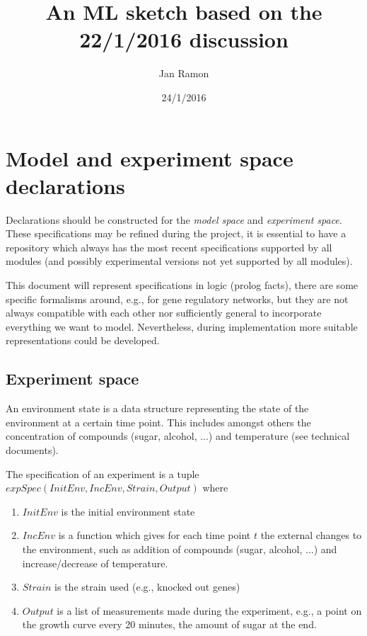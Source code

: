 \documentclass{article}
\begin{document}
\newcommand{\probmodelspace}{\mathcal{P}_\mathcal{M}}
\newcommand{\modelspace}{\mathcal{M}}
\newcommand{\expspace}{\mathcal{E}}
\newcommand{\argmax}{\operatornamewithlimits{argmax}}

\author{Jan Ramon}
\title{An ML sketch based on the 22/1/2016 discussion}
\date{24/1/2016}
\maketitle

\section{Model and experiment space declarations}

Declarations should be constructed for the \textit{model space} and \textit{experiment space}.  These specifications may be refined during the project, it is essential to have a repository which always has the most recent specifications supported by all modules (and possibly experimental versions not yet supported by all modules).

This document will represent specifications in logic (prolog facts),
there are some specific formalisms around, e.g., for gene regulatory networks,
but they are not always compatible with each other nor sufficiently general to
incorporate everything we want to model.
Nevertheless, during implementation more suitable representations could be developed.

\subsection{Experiment space}

An environment state is a data structure representing the state of the environment at a certain time point.  This includes amongst others the concentration of compounds (sugar, alcohol, ...) and temperature (see technical documents).  

The specification of an experiment is a tuple $expSpec(InitEnv,IncEnv,Strain,Output)$ where
\begin{enumerate}
\item $InitEnv$ is the initial environment state
\item $IncEnv$ is a function which gives for each time point $t$ the external changes to the environment, such as addition of compounds (sugar, alcohol, ...) and increase/decrease of temperature.
\item $Strain$ is the strain used (e.g., knocked out genes)
\item $Output$ is a list of measurements made during the experiment, e.g., a point on the growth curve every 20 minutes, the amount of sugar at the end.
\end{enumerate}
\end{document}
